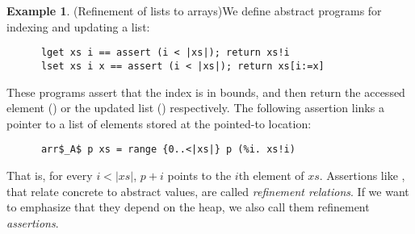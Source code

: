 \documentclass[sn-mathphys,Numbered]{sn-jnl}
\theoremstyle{thmstyleone}%
\theoremstyle{definition}%
\newtheorem{example}{Example}%
\theoremstyle{thmstylethree}%
\begin{document}
  \begin{example}(Refinement of lists to arrays)\label{ex:ref_array}
    We define abstract programs for indexing and updating a list:
    \begin{lstlisting}
      lget xs i == assert (i < |xs|); return xs!i
      lset xs i x == assert (i < |xs|); return xs[i:=x]
    \end{lstlisting}
    These programs assert that the index is in bounds, and then return the accessed element ()
    or the updated list () respectively. The following assertion links a pointer to a list of
    elements stored at the pointed-to location:
    \begin{lstlisting}
      arr$_A$ p xs = range {0..<|xs|} p (%i. xs!i)
    \end{lstlisting}
    That is, for every $i<|xs|$, $p+i$ points to the $i$th element of $xs$.
    Assertions like , that relate concrete to abstract values, are called \emph{refinement relations}.
    If we want to emphasize that they depend on the heap, we also call them refinement \emph{assertions}.


\end{example}
\end{document}
